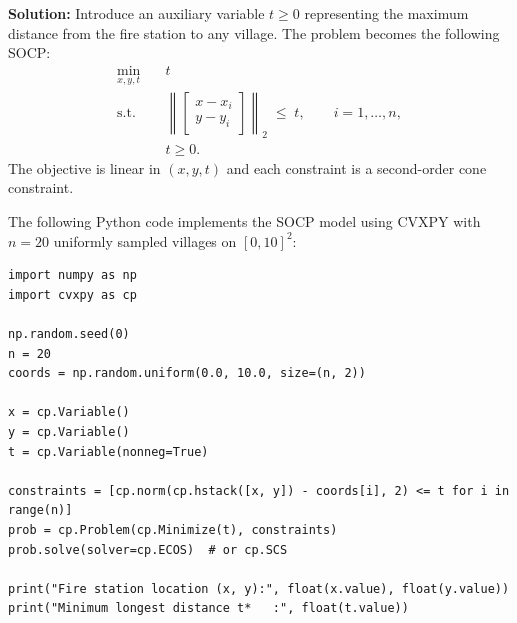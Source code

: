 \documentclass[11pt]{article}
\begin{document}
\begin{enumerate}
\textbf{Solution:} Introduce an auxiliary variable $t\ge 0$ representing the maximum distance from the fire station to any village. The problem becomes the following SOCP:
\[
    \begin{aligned}
    \min_{x,y,t}\quad & t\\
    \text{s.t.}\quad & \left\| \begin{bmatrix} x - x_i \\[2pt] y - y_i \end{bmatrix} \right\|_2 \;\le\; t,\qquad i=1,\dots,n,\\
    & t\ge 0.
    \end{aligned}
\]
The objective is linear in $(x,y,t)$ and each constraint is a second-order cone constraint.

The following Python code implements the SOCP model using CVXPY with $n=20$ uniformly sampled villages on $[0,10]^2$:

\begin{verbatim}
import numpy as np
import cvxpy as cp

np.random.seed(0)
n = 20
coords = np.random.uniform(0.0, 10.0, size=(n, 2))

x = cp.Variable()
y = cp.Variable()
t = cp.Variable(nonneg=True)

constraints = [cp.norm(cp.hstack([x, y]) - coords[i], 2) <= t for i in range(n)]
prob = cp.Problem(cp.Minimize(t), constraints)
prob.solve(solver=cp.ECOS)  # or cp.SCS

print("Fire station location (x, y):", float(x.value), float(y.value))
print("Minimum longest distance t*   :", float(t.value))
\end{verbatim}

    
\end{enumerate}
\end{document}
